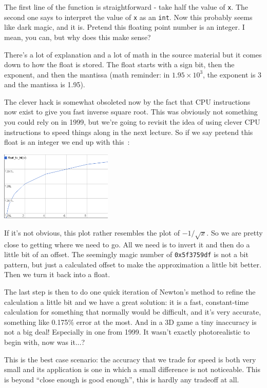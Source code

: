 \documentclass[a4paper]{report}
\begin{document}
The first line of the function is straightforward - take half the value of \texttt{x}. The second one says to interpret the value of \texttt{x} as an \texttt{int}. Now this probably seems like dark magic, and it is. Pretend this floating point number is an integer. I mean, you can, but why does this make sense? 

There's a lot of explanation and a lot of math in the source material but it comes down to how the float is stored. The float starts with a sign bit, then the exponent, and then the mantissa (math reminder: in $1.95 \times 10^{3}$, the exponent is 3 and the mantissa is 1.95).

The clever hack is somewhat obsoleted now by the fact that CPU instructions now exist to give you fast inverse square root. This was obviously not something you could rely on in 1999, but we're going to revisit the idea of using clever CPU instructions to speed things along in the next lecture. So if we say pretend this float is an integer we end up with this~\cite{fisqrt2}:

\begin{center}
	\includegraphics[width=0.4\textwidth]{images/float-to-int.png}
\end{center}

If it's not obvious, this plot rather resembles the plot of $-1/\sqrt{x}$. So we are pretty close to getting where we need to go. All we need is to invert it and then do a little bit of an offset. The seemingly magic number of \texttt{0x5f3759df} is not a bit pattern, but just a calculated offset to make the approximation a little bit better. Then we turn it back into a float.

The last step is then to do one quick iteration of Newton's method to refine the calculation a little bit and we have a great solution: it is a fast, constant-time calculation for something that normally would be difficult, and it's very accurate, something like 0.175\% error at the most. And in a 3D game a tiny inaccuracy is not a big deal! Especially in one from 1999. It wasn't exactly photorealistic to begin with, now was it...?

This is the best case scenario: the accuracy that we trade for speed is both very small and its application is one in which a small difference is not noticeable. This is beyond ``close enough is good enough'', this is hardly any tradeoff at all.
\end{document}
